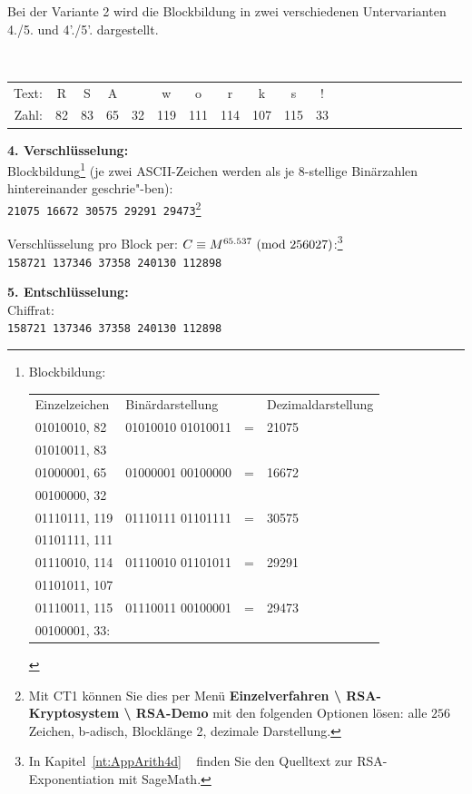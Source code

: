 \begin{refsegment}
Bei der Variante 2 wird die Blockbildung in zwei verschiedenen Untervarianten 4./5. und 4'./5'. dargestellt.

{\tt
\begin{tabular}{rcccccccccccccccccccc}
{\rm Text:} & R & S & A &   & w & o & r & k & s & !\\
{\rm Zahl:} & 82 & 83 & 65 & 32 & 119 & 111 & 114 & 107 & 115 & 33
\end{tabular} } %

\noindent \textbf{4. Verschlüsselung:}\\
Blockbildung\footnote{%
Blockbildung:\\ \tt \begin{tabular}{ll@{ }l@{ }l}
Einzelzeichen& Binärdarstellung  &&Dezimaldarstellung\\
01010010, 82 & 01010010 01010011 & = &21075\\
01010011, 83 &\\
01000001, 65 & 01000001 00100000 & = &16672\\
00100000, 32\\
01110111, 119 & 01110111 01101111 & = &30575\\
01101111, 111\\
01110010, 114 & 01110010 01101011 & = &29291\\
01101011, 107\\
01110011, 115 & 01110011 00100001 & = &29473\\
00100001, 33:
\end{tabular}
} (je zwei ASCII-Zeichen werden als je 8-stellige Binärzahlen hintereinander geschrie"-ben):\\
{\tt 21075 16672 30575 29291 29473}\footnote{%
Mit CT1 können Sie dies per Menü \textbf{Einzelverfahren \textbackslash{}
RSA-Kryptosystem \textbackslash{} RSA-Demo} mit den folgenden Optionen lösen: alle
$256$ Zeichen, b-adisch, Blocklänge 2, dezimale Darstellung.
}

\label{SrcArith4d}
\noindent Verschlüsselung pro Block per: $C \equiv M^{65.537}{\rm ~(mod~}256027)$:\footnote{%
  In Kapitel~\ref{nt:AppArith4d} \glqq {}\grqq~
  finden Sie den Quelltext zur RSA-Exponentiation mit SageMath.
}\\
{\tt 158721 137346 37358 240130 112898}

\noindent \textbf{5. Entschlüsselung:}\\
Chiffrat:\\
{\tt 158721 137346 37358 240130 112898}


\end{refsegment}

